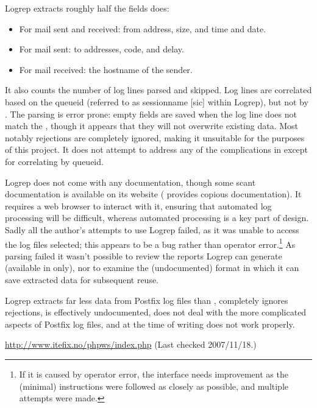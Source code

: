Logrep extracts roughly half the fields \parsername{} does:

\begin{itemize}

    \item For mail sent and received: from address, size, and time and
        date.

    \item For mail sent: to addresses, \SMTP{} code, and delay.

    \item For mail received: the hostname of the sender.

\end{itemize}

It also counts the number of log lines parsed and skipped.  Log lines are
correlated based on the queueid (referred to as sessionname [sic] within
Logrep), but not by \pid{}.  The parsing is error prone: empty fields are
saved when the log line does not match the \regex{}, though it appears that
they will not overwrite existing data.  Most notably rejections are
completely ignored, making it unsuitable for the purposes of this project.
It does not attempt to address any of the complications in
  except for
correlating by queueid.

Logrep does not come with any documentation, though some scant
documentation is available on its website (\parsername{} provides copious
documentation).  It requires a web browser to interact with it, ensuring
that automated log processing will be difficult, whereas automated
processing is a key part of \parsernames{} design.  Sadly all the author's
attempts to use Logrep failed, as it was unable to access the log files
selected; this appears to be a bug rather than operator error.\footnote{If
it is caused by operator error, the interface needs improvement as the
(minimal) instructions were followed as closely as possible, and multiple
attempts were made.}  As parsing failed it wasn't possible to review the
reports Logrep can generate (available in \HTML{} only), nor to examine the
(undocumented) format in which it can save extracted data for subsequent
reuse.

Logrep extracts far less data from Postfix log files than \parsername{},
completely ignores rejections, is effectively undocumented, does not deal
with the more complicated aspects of Postfix log files, and at the time of
writing does not work properly.

\url{http://www.itefix.no/phpws/index.php} \newline (Last checked
2007/11/18.)


